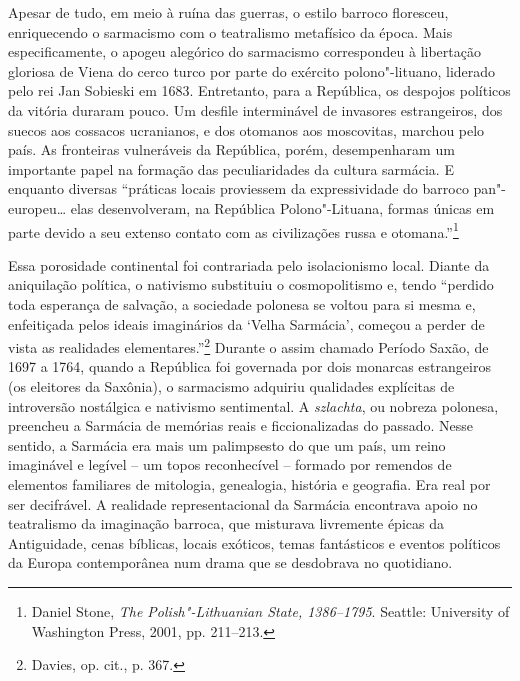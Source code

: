 Apesar de tudo, em meio à ruína das guerras, o estilo barroco floresceu,
enriquecendo o sarmacismo com o teatralismo metafísico da época. Mais
especificamente, o apogeu alegórico do sarmacismo correspondeu à
libertação gloriosa de Viena do cerco turco por parte do exército
polono"-lituano, liderado pelo rei Jan Sobieski em 1683. Entretanto, para
a República, os despojos políticos da vitória duraram pouco. Um desfile
interminável de invasores estrangeiros, dos suecos aos cossacos
ucranianos, e dos otomanos aos moscovitas, marchou pelo país. As
fronteiras vulneráveis da República, porém, desempenharam um importante
papel na formação das peculiaridades da cultura sarmácia. E enquanto
diversas ``práticas locais proviessem da expressividade do barroco
pan"-europeu\ldots{} elas desenvolveram, na República Polono"-Lituana,
formas únicas em parte devido a seu extenso contato com as civilizações
russa e otomana.''\footnote{Daniel Stone, \textit{The Polish"-Lithuanian State, 1386--1795}. Seattle: University of Washington Press, 2001, pp. 211--213.}

Essa porosidade continental foi contrariada pelo isolacionismo local.
Diante da aniquilação política, o nativismo substituiu o cosmopolitismo
e, tendo ``perdido toda esperança de salvação, a sociedade polonesa se
voltou para si mesma e, enfeitiçada pelos ideais imaginários da `Velha
Sarmácia', começou a perder de vista as realidades
elementares.''\footnote{Davies, op. cit., p. 367.} Durante o assim
chamado Período Saxão, de 1697 a 1764, quando a República foi governada por
dois monarcas estrangeiros (os eleitores da Saxônia), o sarmacismo
adquiriu qualidades explícitas de introversão nostálgica e nativismo
sentimental. A \textit{szlachta}, ou nobreza polonesa, preencheu a Sarmácia
de memórias reais e ficcionalizadas do passado. Nesse sentido, a
Sarmácia era mais um palimpsesto do que um país, um reino imaginável e
legível -- um topos reconhecível -- formado por remendos de elementos
familiares de mitologia, genealogia, história e geografia. Era real por
ser decifrável. A realidade representacional da Sarmácia encontrava
apoio no teatralismo da imaginação barroca, que misturava livremente
épicas da Antiguidade, cenas bíblicas, locais exóticos, temas
fantásticos e eventos políticos da Europa contemporânea num drama que se
desdobrava no quotidiano.

